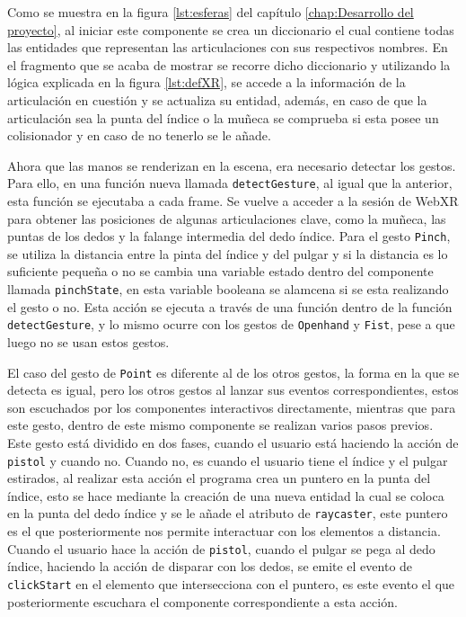 \documentclass[a4paper, 12pt]{book}
\begin{document}
Como se muestra en la figura \ref{lst:esferas} del capítulo \ref{chap:Desarrollo del proyecto}, al iniciar este componente se crea un diccionario  el cual contiene todas las entidades que representan las articulaciones con sus respectivos nombres. En el fragmento que se acaba de mostrar se recorre dicho diccionario y utilizando la lógica explicada en la figura \ref{lst:defXR}, se accede a la información de la articulación en cuestión y se actualiza su entidad, además, en caso de que la articulación sea la punta del índice o la muñeca se comprueba si esta posee un colisionador y en caso de no tenerlo se le añade.

Ahora que las manos se renderizan en la escena, era necesario detectar los gestos. Para ello, en una función nueva llamada \texttt{detectGesture}, al igual que la anterior, esta función se ejecutaba a cada frame. Se vuelve a acceder a la sesión de WebXR para obtener las posiciones de algunas articulaciones clave, como la muñeca, las puntas de los dedos y la falange intermedia del dedo índice.
Para el gesto \texttt{Pinch}, se utiliza la distancia entre la pinta del índice y del pulgar y si la distancia es lo suficiente pequeña o no se cambia una variable estado dentro del componente llamada \texttt{pinchState}, en esta variable booleana se alamcena si se esta realizando el gesto o no. Esta acción se ejecuta a través de una función dentro de la función \texttt{detectGesture}, y lo mismo ocurre con los gestos de \texttt{Openhand} y \texttt{Fist}, pese a que luego no se usan estos gestos. 

El caso del gesto de \texttt{Point} es diferente al de los otros gestos, la forma en la que se detecta es igual, pero los otros gestos al lanzar sus eventos correspondientes, estos son escuchados por los componentes interactivos directamente, mientras que para este gesto,
dentro de este mismo componente se realizan varios pasos previos. Este gesto está dividido en dos fases, cuando el usuario está haciendo la acción de \texttt{pistol} y cuando no. Cuando no, es cuando el usuario tiene el índice y el pulgar estirados, al realizar esta acción el programa crea un puntero en la punta del índice, esto se hace mediante la creación de una nueva entidad la cual se coloca en la punta del dedo índice y se le añade el atributo de \texttt{raycaster}, este puntero es el que posteriormente nos permite interactuar con los elementos a distancia. Cuando el usuario hace la acción de \texttt{pistol}, cuando el pulgar se pega al dedo índice, haciendo la acción de disparar con los dedos, se emite el evento de \texttt{clickStart} en el elemento que intersecciona con el puntero, es este evento el que posteriormente escuchara el componente correspondiente a esta acción. 
\end{document}
